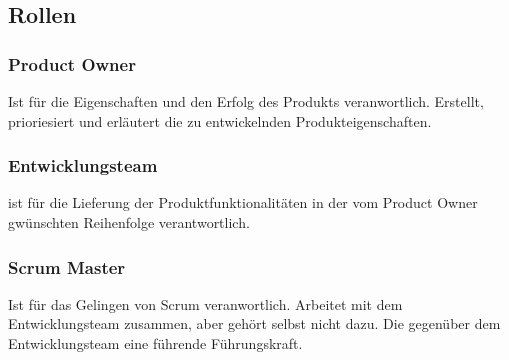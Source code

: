 \documentclass[a4paper]{article}
\theoremstyle{break}
\begin{document}
        \subsection{Rollen}
            \subsubsection{Product Owner}
            Ist für die Eigenschaften und den Erfolg des Produkts veranwortlich.
            Erstellt, prioriesiert und erläutert die zu entwickelnden Produkteigenschaften.
            \subsubsection{Entwicklungsteam}
                ist für die Lieferung der Produktfunktionalitäten in der vom Product Owner gwünschten Reihenfolge verantwortlich.    
            \subsubsection{Scrum Master}
            Ist für das Gelingen von Scrum veranwortlich. Arbeitet mit dem Entwicklungsteam zusammen, aber gehört selbst nicht dazu.
            Die gegenüber dem Entwicklungsteam eine führende Führungskraft.
    
\end{document}
